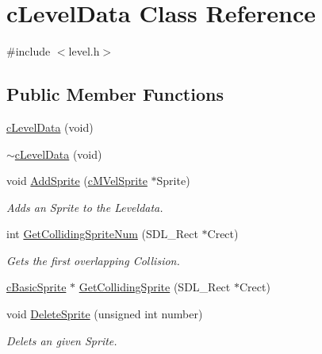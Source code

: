 \hypertarget{classc_level_data}{\section{c\-Level\-Data Class Reference}
\label{classc_level_data}
}


{\ttfamily \#include $<$level.\-h$>$}

\subsection*{Public Member Functions}
\begin{DoxyCompactItemize}
\item 
\hyperlink{classc_level_data_a195bc0671bb171a218558572cacd622e}{c\-Level\-Data} (void)
\item 
\hyperlink{classc_level_data_a5ae902555e83ea02c7ed497ccdb74d85}{$\sim$c\-Level\-Data} (void)
\item 
void \hyperlink{classc_level_data_ac868f4fdf7cf4bd9bb007426b65fc0ab}{Add\-Sprite} (\hyperlink{classc_m_vel_sprite}{c\-M\-Vel\-Sprite} $\ast$Sprite)
\begin{DoxyCompactList}\small\item\em Adds an Sprite to the Leveldata. \end{DoxyCompactList}\item 
int \hyperlink{classc_level_data_a8aa8699eafb268cb0453ffe7ba28d905}{Get\-Colliding\-Sprite\-Num} (S\-D\-L\-\_\-\-Rect $\ast$Crect)
\begin{DoxyCompactList}\small\item\em Gets the first overlapping Collision. \end{DoxyCompactList}\item 
\hyperlink{classc_basic_sprite}{c\-Basic\-Sprite} $\ast$ \hyperlink{classc_level_data_aa395a28b4d3f5f1b21265f59f632a936}{Get\-Colliding\-Sprite} (S\-D\-L\-\_\-\-Rect $\ast$Crect)
\item 
void \hyperlink{classc_level_data_a3fddca9f09bf3d7e1fe8e12a16ed01ab}{Delete\-Sprite} (unsigned int number)
\begin{DoxyCompactList}\small\item\em Delets an given Sprite. \end{DoxyCompactList}\end{DoxyCompactItemize}
